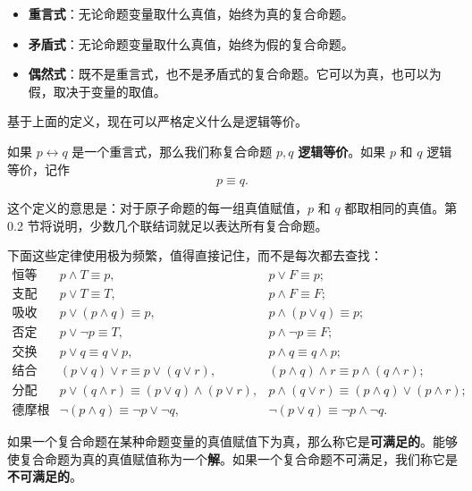 \begin{itemize}
    \item \textbf{重言式}：无论命题变量取什么真值，始终为真的复合命题。
    \item \textbf{矛盾式}：无论命题变量取什么真值，始终为假的复合命题。
    \item \textbf{偶然式}：既不是重言式，也不是矛盾式的复合命题。它可以为真，也可以为假，取决于变量的取值。
\end{itemize}

基于上面的定义，现在可以严格定义什么是逻辑等价。

\begin{definition}[逻辑等价]
如果 $p\leftrightarrow q$ 是一个重言式，那么我们称复合命题 $p,q$ \textbf{逻辑等价}。如果 $p$ 和 $q$ 逻辑等价，记作
\[
p\equiv q.
\]
\end{definition}

这个定义的意思是：对于原子命题的每一组真值赋值，$p$ 和 $q$ 都取相同的真值。第 0.2 节将说明，少数几个联结词就足以表达所有复合命题。

下面这些定律使用极为频繁，值得直接记住，而不是每次都去查找：
\begin{align*}
\text{恒等律：}\quad & p\wedge T\equiv p, & p\vee F\equiv p; \\
\text{支配律：}\quad & p\vee T\equiv T, & p\wedge F\equiv F; \\
\text{吸收律：}\quad & p\vee(p\wedge q)\equiv p, & p\wedge(p\vee q)\equiv p; \\
\text{否定律：}\quad & p\vee\neg p\equiv T, & p\wedge\neg p\equiv F; \\
\text{交换律：}\quad & p\vee q\equiv q\vee p, & p\wedge q\equiv q\wedge p; \\
\text{结合律：}\quad & (p\vee q)\vee r\equiv p\vee(q\vee r), & (p\wedge q)\wedge r\equiv p\wedge(q\wedge r); \\
\text{分配律：}\quad & p\vee(q\wedge r)\equiv(p\vee q)\wedge(p\vee r), & p\wedge(q\vee r)\equiv(p\wedge q)\vee(p\wedge r); \\
\text{德摩根律：}\quad & \neg(p\wedge q)\equiv\neg p\vee\neg q, & \neg(p\vee q)\equiv\neg p\wedge\neg q.
\end{align*}

\begin{definition}[可满足性]
如果一个复合命题在某种命题变量的真值赋值下为真，那么称它是\textbf{可满足的}。能够使复合命题为真的真值赋值称为一个\textbf{解}。如果一个复合命题不可满足，我们称它是\textbf{不可满足的}。
\end{definition}

